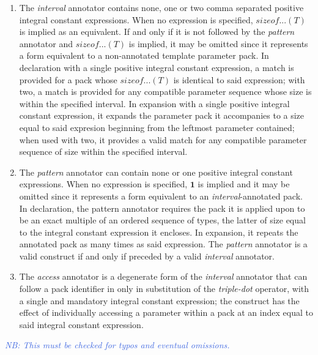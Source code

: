\begin{enumerate}
\item\p The \textit{interval} annotator contains none, one or two comma separated positive integral constant expressions.
When no expression is specified, $sizeof...(T)$ is implied as an equivalent.
If and only if it is not followed by the \textit{pattern} annotator and $sizeof...(T)$ is implied, it may be omitted since it represents a form equivalent to a non-annotated template parameter pack.
In declaration with a single positive integral constant expression, a match is provided for a pack whose $sizeof...(T)$ is identical to said expression; with two, a match is provided for any compatible parameter sequence whose size is within the specified interval.
In expansion with a single positive integral constant expression, it expands the parameter pack it accompanies to a size equal to said expresion beginning from the leftmost parameter contained;
when used with two, it provides a valid match for any compatible parameter sequence of size within the specified interval.

\item\p The \textit{pattern} annotator can contain none or one positive integral constant expressions.
When no expression is specified, $\bm{1}$ is implied and it may be omitted since it represents a form equivalent to an \textit{interval}-annotated pack.
In declaration, the pattern annotator requires the pack it is applied upon to be an exact multiple of an ordered sequence of types, the latter of size equal to the integral constant expression it encloses. In expansion, it repeats the annotated pack as many times as said expression.
The \textit{pattern} annotator is a valid construct if and only if preceded by a valid \textit{interval} annotator.

\item\p The \textit{access} annotator is a degenerate form of the \textit{interval} annotator that can follow a pack identifier in only in substitution of the \textit{triple-dot} operator, with a single and mandatory integral constant expression; the construct has the effect of individually accessing a parameter within a pack at an index equal to said integral constant expression.
\end{enumerate}

\textcolor{RoyalBlue}{\textit{NB: This must be checked for typos and eventual omissions.}}

